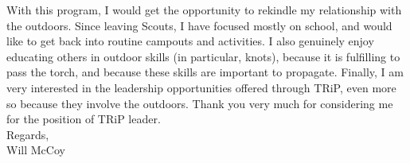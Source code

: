 \documentclass{article}
\begin{document}
With this program, I would get the opportunity to rekindle my relationship with the outdoors.
Since leaving Scouts, I have focused mostly on school, and would like to get back into routine campouts and activities.
I also genuinely enjoy educating others in outdoor skills (in particular, knots), because it is fulfilling to pass the torch, and because these skills are important to propagate.
Finally, I am very interested in the leadership opportunities offered through TRiP, even more so because they involve the outdoors.
Thank you very much for considering me for the position of TRiP leader.
\\


Regards,\\
Will McCoy
\end{document}
